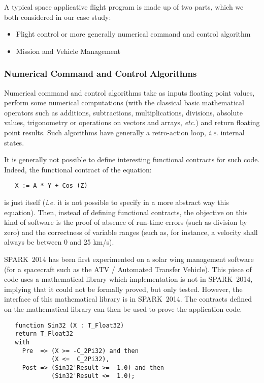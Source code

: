 \documentclass[10pt,a4paper,twocolumn]{article}
\newcommand{\newspark}{SPARK~2014\xspace}
\newcommand{\etc}{\textit{etc.}\xspace}
\newcommand{\ie}{\textit{i.e.}\xspace}
\begin{document}
A typical space applicative flight program is made up of two parts, which we
both considered in our case study:

\begin{itemize}
\item Flight control or more generally numerical command and control algorithm
\item Mission and Vehicle Management
\end{itemize}

\subsubsection{Numerical Command and Control Algorithms}

Numerical command and control algorithms take as inputs floating point values,
perform some numerical computations (with the classical basic mathematical
operators such as additions, subtractions, multiplications, divisions, absolute
values, trigonometry or operations on vectors and arrays, \etc) and return
floating point results. Such algorithms have generally a retro-action loop, \ie
internal states.

It is generally not possible to define interesting functional contracts for
such code. Indeed, the functional contract of the equation:

\begin{lstlisting}
   X := A * Y + Cos (Z)
\end{lstlisting}

\noindent
is just itself (\ie it is not possible to specify in a more abstract way this
equation). Then, instead of defining functional contracts, the objective on
this kind of software is the proof of absence of run-time errors (such as
division by zero) and the correctness of variable ranges (such as, for
instance, a velocity shall always be between 0 and 25 km/s).

\newspark has been first experimented on a solar wing management software (for a spacecraft such as the ATV / Automated Transfer Vehicle).
This piece of code uses a mathematical library which implementation is not in \newspark, implying that it could not be formally proved, but only tested. However, the interface of this mathematical library is in \newspark. The contracts defined on the mathematical library can then be used to prove the application code.

\begin{lstlisting}
   function Sin32 (X : T_Float32)
   return T_Float32
   with
     Pre  => (X >= -C_2Pi32) and then
             (X <=  C_2Pi32),
     Post => (Sin32'Result >= -1.0) and then
             (Sin32'Result <=  1.0);
\end{lstlisting}
\end{document}
